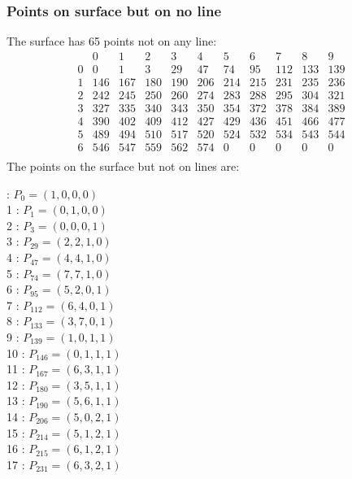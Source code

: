\documentclass{article}
\begin{document}
{\subsubsection*{Points on surface but on no line}
The surface has 65 points not on any line:\\
$$
\begin{array}{r|*{10}{r}}
 & 0 & 1 & 2 & 3 & 4 & 5 & 6 & 7 & 8 & 9\\
\hline
0 & 0 & 1 & 3 & 29 & 47 & 74 & 95 & 112 & 133 & 139\\
1 & 146 & 167 & 180 & 190 & 206 & 214 & 215 & 231 & 235 & 236\\
2 & 242 & 245 & 250 & 260 & 274 & 283 & 288 & 295 & 304 & 321\\
3 & 327 & 335 & 340 & 343 & 350 & 354 & 372 & 378 & 384 & 389\\
4 & 390 & 402 & 409 & 412 & 427 & 429 & 436 & 451 & 466 & 477\\
5 & 489 & 494 & 510 & 517 & 520 & 524 & 532 & 534 & 543 & 544\\
6 & 546 & 547 & 559 & 562 & 574 & 0 & 0 & 0 & 0 & 0\\
\end{array}
$$
The points on the surface but not on lines are:\\
\begin{multicols}{2}
 : $P_{0}=( 1, 0, 0, 0 )$\\
1 : $P_{1}=( 0, 1, 0, 0 )$\\
2 : $P_{3}=( 0, 0, 0, 1 )$\\
3 : $P_{29}=( 2, 2, 1, 0 )$\\
4 : $P_{47}=( 4, 4, 1, 0 )$\\
5 : $P_{74}=( 7, 7, 1, 0 )$\\
6 : $P_{95}=( 5, 2, 0, 1 )$\\
7 : $P_{112}=( 6, 4, 0, 1 )$\\
8 : $P_{133}=( 3, 7, 0, 1 )$\\
9 : $P_{139}=( 1, 0, 1, 1 )$\\
10 : $P_{146}=( 0, 1, 1, 1 )$\\
11 : $P_{167}=( 6, 3, 1, 1 )$\\
12 : $P_{180}=( 3, 5, 1, 1 )$\\
13 : $P_{190}=( 5, 6, 1, 1 )$\\
14 : $P_{206}=( 5, 0, 2, 1 )$\\
15 : $P_{214}=( 5, 1, 2, 1 )$\\
16 : $P_{215}=( 6, 1, 2, 1 )$\\
17 : $P_{231}=( 6, 3, 2, 1 )$\\

\end{multicols}}
\end{document}
